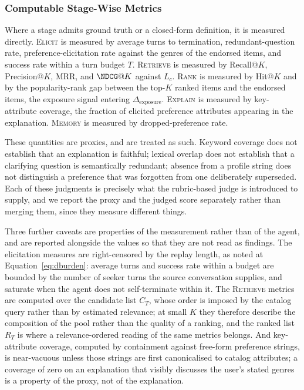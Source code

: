 \documentclass[manuscript,screen,review]{acmart}
\newcommand{\Dexposure}{\Delta_{\mathrm{exposure}}}
\newcommand{\stage}[1]{\textsc{#1}}
\begin{document}
\subsubsection{Computable Stage-Wise Metrics}
\label{sec:computable}

Where a stage admits ground truth or a closed-form definition, it is measured
directly. \stage{Elicit} is measured by average turns to termination,
redundant-question rate, preference-elicitation rate against the genres of the
endorsed items, and success rate within a turn budget $T$. \stage{Retrieve} is
measured by Recall@$K$, Precision@$K$, MRR, and $\NDCG@K$ against $L_c$.
\stage{Rank} is measured by Hit@$K$ and by the popularity-rank gap between the
top-$K$ ranked items and the endorsed items, the exposure signal entering
$\Dexposure$. \stage{Explain} is measured by key-attribute coverage, the fraction
of elicited preference attributes appearing in the explanation. \stage{Memory} is
measured by dropped-preference rate.

These quantities are proxies, and are treated as such. Keyword coverage does not
establish that an explanation is faithful; lexical overlap does not establish that
a clarifying question is semantically redundant; absence from a profile string
does not distinguish a preference that was forgotten from one deliberately
superseded. Each of these judgments is precisely what the rubric-based judge is
introduced to supply, and we report the proxy and the judged score separately
rather than merging them, since they measure different things.

Three further caveats are properties of the measurement rather than of the agent,
and are reported alongside the values so that they are not read as findings. The
elicitation measures are right-censored by the replay length, as noted at
Equation~\eqref{eq:dburden}: average turns and success rate within a budget are
bounded by the number of seeker turns the source conversation supplies, and
saturate when the agent does not self-terminate within it. The \stage{Retrieve}
metrics are computed over the candidate list $C_T$, whose order is imposed by the
catalog query rather than by estimated relevance; at small $K$ they therefore
describe the composition of the pool rather than the quality of a ranking, and the
ranked list $R_T$ is where a relevance-ordered reading of the same metrics belongs.
And key-attribute coverage, computed by containment against free-form preference
strings, is near-vacuous unless those strings are first canonicalised to catalog
attributes; a coverage of zero on an explanation that visibly discusses the user's
stated genres is a property of the proxy, not of the explanation.
\end{document}
